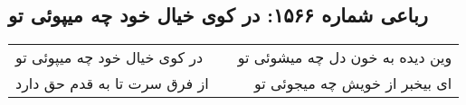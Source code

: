 \begin{center}
\section*{رباعی شماره ۱۵۶۶: در کوی خیال خود چه میپوئی تو}
\label{sec:1566}
\begin{longtable}{l p{0.5cm} r}
در کوی خیال خود چه میپوئی تو
&&
وین دیده به خون دل چه میشوئی تو
\\
از فرق سرت تا به قدم حق دارد
&&
ای بیخبر از خویش چه میجوئی تو
\\
\end{longtable}
\end{center}
